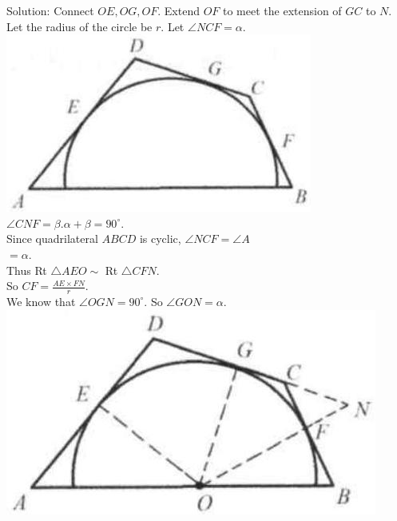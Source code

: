 \documentclass[10pt]{article}
\begin{document}
Solution:
Connect \(O E, O G, O F\). Extend \(O F\) to meet the extension of \(G C\) to \(N\).\\
Let the radius of the circle be \(r\). Let \(\angle N C F=\alpha\).\\
\includegraphics[max width=\textwidth, center]{2025_04_17_97bc1f7e44d93c271a88g-149}\\
\(\angle C N F=\beta . \alpha+\beta=90^{\circ}\).\\
Since quadrilateral \(A B C D\) is cyclic, \(\angle N C F=\angle A\)\\
\(=\alpha\).\\
Thus Rt \(\triangle A E O \sim\) Rt \(\triangle C F N\).\\
So \(C F=\frac{A E \times F N}{r}\).\\
We know that \(\angle O G N=90^{\circ}\). So \(\angle G O N=\alpha\).\\
\includegraphics[max width=\textwidth, center]{2025_04_17_97bc1f7e44d93c271a88g-149(2)}
\end{document}
